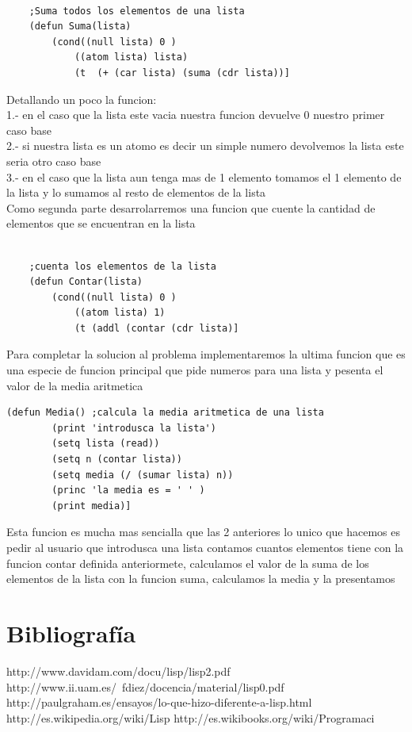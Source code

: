 \documentclass[11pt]{article} %
\begin{document}
\begin{lstlisting}[frame=single]
	
	;Suma todos los elementos de una lista
	(defun Suma(lista)
		(cond((null lista) 0 )
			((atom lista) lista)
			(t  (+ (car lista) (suma (cdr lista))] 
\end{lstlisting}

Detallando un poco la funcion:\\
1.- en el caso que la lista este vacia nuestra funcion devuelve 0 nuestro primer caso base\\
2.- si nuestra lista es un atomo es decir un simple numero devolvemos la lista este seria otro caso base\\
3.- en el caso que la lista aun tenga mas de 1 elemento tomamos el 1 elemento de la lista y lo sumamos al resto de elementos de la lista\\

Como segunda parte desarrolarremos una funcion que cuente la cantidad de elementos que se encuentran en la lista

\lstset{language=LISP}          %

\begin{lstlisting}[frame=single]
	
	;cuenta los elementos de la lista
	(defun Contar(lista)
		(cond((null lista) 0 )
			((atom lista) 1)
			(t (addl (contar (cdr lista)] 
\end{lstlisting}

Para completar la solucion al problema implementaremos la ultima funcion que es una especie de funcion principal que pide numeros para una lista y pesenta el valor de la media aritmetica

\lstset{language=LISP}          %

\begin{lstlisting}[frame=single]
	(defun Media() ;calcula la media aritmetica de una lista
		(print 'introdusca la lista')
		(setq lista (read))
		(setq n (contar lista))
		(setq media (/ (sumar lista) n))
		(princ 'la media es = ' ' )
		(print media)]
\end{lstlisting}

Esta funcion es mucha mas sencialla que las 2 anteriores lo unico que hacemos es pedir al usuario que introdusca una lista contamos cuantos elementos tiene con la funcion contar definida anteriormete, calculamos el valor de la suma de los elementos de la lista con la funcion suma, calculamos la media y la presentamos

\section{Bibliografía}


http://www.davidam.com/docu/lisp/lisp2.pdf
http://www.ii.uam.es/~fdiez/docencia/material/lisp0.pdf
http://paulgraham.es/ensayos/lo-que-hizo-diferente-a-lisp.html
http://es.wikipedia.org/wiki/Lisp
http://es.wikibooks.org/wiki/Programaci%
  
\end{document}
